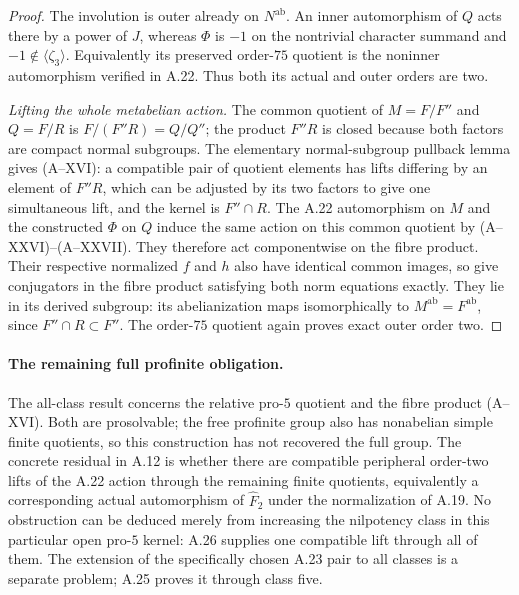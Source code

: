 \begin{proof}
The involution is outer already on $N^{\mathrm{ab}}$.
An inner automorphism of $Q$ acts there by a
power of $J$, whereas $\Phi$ is $-1$ on the
nontrivial character summand and
$-1\notin\langle\zeta_3\rangle$.
Equivalently its preserved order-$75$ quotient
is the noninner automorphism verified in A.22.
Thus both its actual and outer orders are two.

\emph{Lifting the whole metabelian action.}
The common quotient of $M=F/F''$ and $Q=F/R$
is $F/(F''R)=Q/Q''$; the product $F''R$ is
closed because both factors are compact normal
subgroups. The elementary normal-subgroup
pullback lemma gives (A--XVI): a compatible
pair of quotient elements has lifts differing
by an element of $F''R$, which can be adjusted
by its two factors to give one simultaneous
lift, and the kernel is $F''\cap R$.
The A.22 automorphism on $M$ and the constructed
$\Phi$ on $Q$ induce the same action on this
common quotient by (A--XXVI)--(A--XXVII).
They therefore act componentwise on the
fibre product. Their respective normalized
$f$ and $h$ also have identical common images,
so give conjugators in the fibre product
satisfying both norm equations exactly.
They lie in its derived subgroup: its
abelianization maps isomorphically to
$M^{\mathrm{ab}}=F^{\mathrm{ab}}$, since
$F''\cap R\subset F''$.
The order-$75$ quotient again proves exact
outer order two.
\end{proof}

\paragraph{The remaining full profinite obligation.}
The all-class result concerns the relative pro-$5$
quotient and the fibre product (A--XVI). Both are
prosolvable; the free profinite group also has
nonabelian simple finite quotients, so this
construction has not recovered the full group.
The concrete residual in A.12 is whether there
are compatible peripheral order-two lifts of
the A.22 action through the remaining finite
quotients, equivalently a corresponding actual
automorphism of $\widehat F_2$ under the
normalization of A.19. No obstruction can be
deduced merely from increasing the nilpotency
class in this particular open pro-$5$ kernel:
A.26 supplies one compatible lift through all
of them. The extension of the specifically
chosen A.23 pair to all classes is a separate
problem; A.25 proves it through class five.
